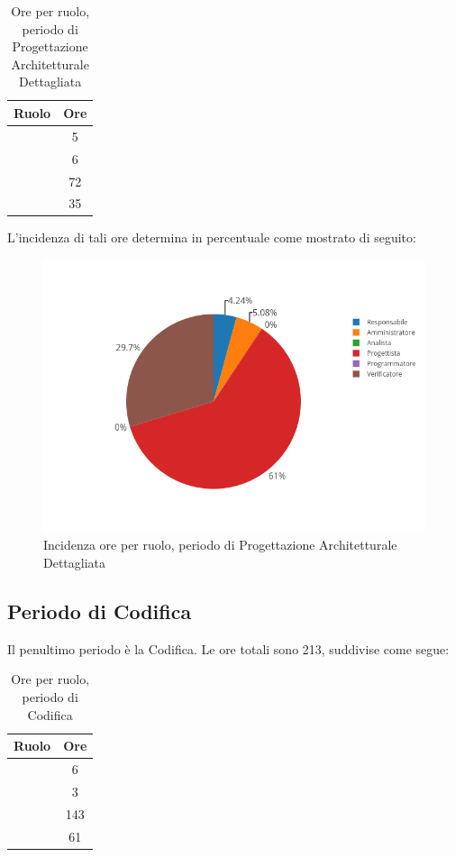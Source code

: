 \begin{table}[H]
	\begin{center}
		\begin{tabular}{|c|c|}
			\hline
			\textbf{Ruolo}	& \textbf{Ore} \\
			\hline
			\Res	&	5	\\
			\hline
			\Amm	&	6	\\
			\hline
			\Prog   &	72	\\
			\hline
			\Ver	&	35	\\
			\hline
		\end{tabular}
	\end{center}
	\caption{Ore per ruolo, periodo di Progettazione Architetturale Dettagliata}
\end{table}

L'incidenza di tali ore determina in percentuale come mostrato di seguito:
\begin{figure}[H]
	\centering
	\includegraphics[scale=0.6]{img/ProgettazioneDettaglio.png}
	\caption{Incidenza ore per ruolo, periodo di Progettazione Architetturale Dettagliata}
\end{figure}

\subsection{Periodo di Codifica}
Il penultimo periodo è la Codifica. Le ore totali sono 213, suddivise come segue:

\begin{table}[H]
	\begin{center}
		\begin{tabular}{|c|c|}
			\hline
			\textbf{Ruolo}	& \textbf{Ore} \\
			\hline
			\Res	&	6	\\
			\hline
			\Amm	&	3	\\
			\hline
			\Progr   &	143	\\
			\hline
			\Ver	&	61	\\
			\hline
		\end{tabular}
	\end{center}
	\caption{Ore per ruolo, periodo di Codifica}
\end{table}

